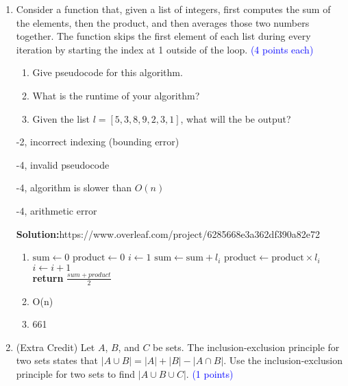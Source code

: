 \documentclass{article}
\newcommand{\pt}[1]{\textcolor{blue}{(#1 points)}}
\newcommand{\pte}[1]{\textcolor{blue}{(#1 points each)}}
\newenvironment{solution}
{
\par
\color{blue}
\textbf{Solution:}https://www.overleaf.com/project/6285668e3a362df390a82e72
}
{
\par
}
\newenvironment{rubric}
{
\par
\begin{spacing}{.6}
\begin{itshape}
\color{red}

}
{
\end{itshape}
\end{spacing}
\par
}
\begin{document}
\begin{enumerate}
\begin{solution}
\end{solution}

\item Consider a function that, given a list of integers, first computes the sum of the elements, then the product, and then averages those two numbers together. The function skips the first element of each list during every iteration by starting the index at 1 outside of the loop. \pte{4}
\begin{enumerate}
    \item Give pseudocode for this algorithm.
    \item What is the runtime of your algorithm?
    \item Given the list $l = [5,3,8,9,2,3,1]$, what will the be output?
\end{enumerate}

\begin{rubric}
-2, incorrect indexing (bounding error)

-4, invalid pseudocode

-4, algorithm is slower than $O(n)$

-4, arithmetic error
\end{rubric}

\begin{solution}
\begin{enumerate}
    \item 
    \begin{algorithmic}
    \State $\text{sum} \gets 0$
    \State $\text{product} \gets 0$
    \State $i \gets 1$
        \State $\text{sum} \gets \text{sum} + l_{i}$
        \State $\text{product} \gets \text{product} \times l_{i}$
        \State $i \gets i + 1$
        \EndWhile \\
    \textbf{return} $\frac{sum+product}{2}$
\end{algorithmic}

    \item O(n)
    \item 661
\end{enumerate}
\end{solution}

\item (Extra Credit) Let $A$, $B$, and $C$ be sets. The inclusion-exclusion principle for two sets states that $|A \cup B| = |A| + |B| - |A \cap B|$. Use the inclusion-exclusion principle for two sets to find $|A \cup B \cup C|.$ \pt{1}


\end{enumerate}
\end{document}
